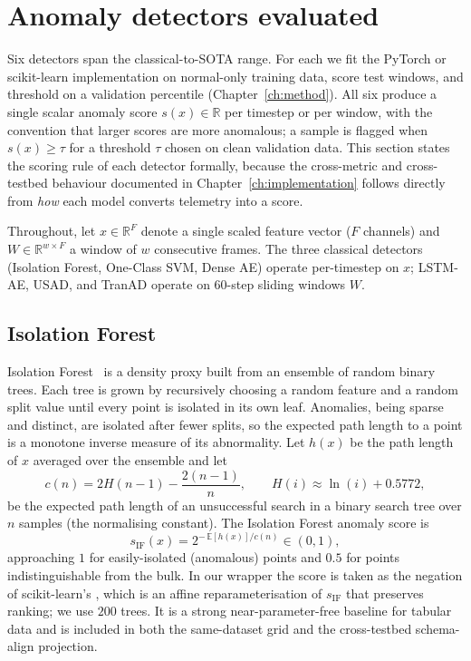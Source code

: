 \section{Anomaly detectors evaluated}
\label{sec:detectors}

Six detectors span the classical-to-SOTA range.  For each we fit the PyTorch or scikit-learn implementation on normal-only training data, score test windows, and threshold on a validation percentile (Chapter~\ref{ch:method}).  All six produce a single scalar anomaly score $s(x) \in \mathbb{R}$ per timestep or per window, with the convention that larger scores are more anomalous; a sample is flagged when $s(x) \geq \tau$ for a threshold $\tau$ chosen on clean validation data.  This section states the scoring rule of each detector formally, because the cross-metric and cross-testbed behaviour documented in Chapter~\ref{ch:implementation} follows directly from \emph{how} each model converts telemetry into a score.

Throughout, let $x \in \mathbb{R}^{F}$ denote a single scaled feature vector ($F$ channels) and $W \in \mathbb{R}^{w \times F}$ a window of $w$ consecutive frames.  The three classical detectors (Isolation Forest, One-Class SVM, Dense AE) operate per-timestep on $x$; LSTM-AE, USAD, and TranAD operate on $60$-step sliding windows $W$.

\subsection{Isolation Forest}
\label{sec:det-if}

Isolation Forest~\cite{liu2008isolation} is a density proxy built from an ensemble of random binary trees.  Each tree is grown by recursively choosing a random feature and a random split value until every point is isolated in its own leaf.  Anomalies, being sparse and distinct, are isolated after fewer splits, so the expected path length to a point is a monotone inverse measure of its abnormality.  Let $h(x)$ be the path length of $x$ averaged over the ensemble and let
\begin{equation}
  c(n) = 2H(n-1) - \frac{2(n-1)}{n}, \qquad H(i) \approx \ln(i) + 0.5772,
\end{equation}
be the expected path length of an unsuccessful search in a binary search tree over $n$ samples (the normalising constant).  The Isolation Forest anomaly score is
\begin{equation}
  s_{\mathrm{IF}}(x) = 2^{-\,\mathbb{E}[h(x)] / c(n)} \in (0, 1),
\end{equation}
approaching $1$ for easily-isolated (anomalous) points and $0.5$ for points indistinguishable from the bulk.  In our wrapper the score is taken as the negation of scikit-learn's , which is an affine reparameterisation of $s_{\mathrm{IF}}$ that preserves ranking; we use $200$ trees.  It is a strong near-parameter-free baseline for tabular data and is included in both the same-dataset grid and the cross-testbed schema-align projection.


